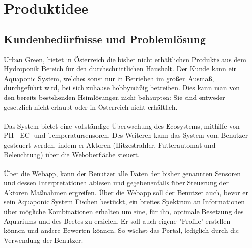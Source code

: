 \documentclass[11pt]{article}
\begin{document}
\section{Produktidee}
\subsection{Kundenbed\"urfnisse und Probleml\"osung}
Urban Green, bietet in \"Osterreich die bisher nicht erh\"altlichen Produkte aus dem Hydroponik Bereich f\"ur den durchschnittlichen Haushalt. Der Kunde kann ein Aquaponic System, welches sonst nur in Betrieben im
großen Ausmaß, durchgef\"uhrt wird, bei sich zuhause hobbym\"aßig betreiben. Dies kann man von den bereits bestehenden Heiml\"osungen nicht behaupten: Sie sind entweder gesetzlich nicht erlaubt oder in \"Osterreich nicht erh\"altlich.\\
\\ Das System bietet eine vollst\"andige \"Uberwachung des Ecosystems, mithilfe von PH-, EC- und Temperatursensoren. Des Weiteren kann das System vom Benutzer gesteuert werden, indem er Aktoren (Hitzestrahler, Futterautomat und Beleuchtung) \"uber die Weboberfl\"ache steuert. \\
\\ \"Uber die Webapp, kann der Benutzer alle Daten der bisher genannten Sensoren und dessen Interpretationen ablesen und gegebenenfalls \"uber Steuerung der Aktoren Maßnahmen ergreifen. \"Uber die Webapp soll der Benutzer auch, bevor er sein Aquaponic System Fischen best\"uckt, ein breites Spektrum an Informationen \"uber m\"ogliche Kombinationen erhalten um eine, f\"ur ihn, optimale Besetzung des Aquariums und des Beetes zu erzielen. Er soll auch eigene "Profile" erstellen k\"onnen und andere Bewerten k\"onnen. So w\"achst das Portal, lediglich durch die Verwendung der Benutzer.
\newpage
\end{document}
